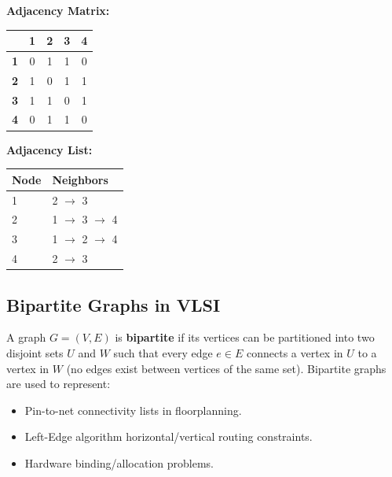 \documentclass[12pt,a4paper]{article}
\renewcommand{\arraystretch}{1.45}
\begin{document}
\begin{tcolorbox}[tikzbox, title={Graph Representation Example}]
\centering
\begin{minipage}{0.3\linewidth}
\centering
{}
\end{minipage}\hfill
\begin{minipage}{0.32\linewidth}
\centering
\textbf{Adjacency Matrix:}\par\noindent
{\renewcommand{\arraystretch}{1.2}%
\begin{tabular}{|c|c|c|c|c|}
\hline
& \textbf{1} & \textbf{2} & \textbf{3} & \textbf{4} \\
\hline
\textbf{1} & 0 & 1 & 1 & 0 \\
\hline
\textbf{2} & 1 & 0 & 1 & 1 \\
\hline
\textbf{3} & 1 & 1 & 0 & 1 \\
\hline
\textbf{4} & 0 & 1 & 1 & 0 \\
\hline
\end{tabular}}
\end{minipage}\hfill
\begin{minipage}{0.32\linewidth}
\centering
\textbf{Adjacency List:}\par\noindent
{\renewcommand{\arraystretch}{1.2}%
\begin{tabular}{|l|l|}
\hline
\textbf{Node} & \textbf{Neighbors} \\
\hline
1 & 2 $\rightarrow$ 3 \\
\hline
2 & 1 $\rightarrow$ 3 $\rightarrow$ 4 \\
\hline
3 & 1 $\rightarrow$ 2 $\rightarrow$ 4 \\
\hline
4 & 2 $\rightarrow$ 3 \\
\hline
\end{tabular}}
\end{minipage}
\end{tcolorbox}

\subsection{Bipartite Graphs in VLSI}
A graph $G = (V, E)$ is \textbf{bipartite} if its vertices can be partitioned into two disjoint sets $U$ and $W$ such that every edge $e \in E$ connects a vertex in $U$ to a vertex in $W$ (no edges exist between vertices of the same set). Bipartite graphs are used to represent:
\begin{itemize}[leftmargin=*, itemsep=2pt]
  \item Pin-to-net connectivity lists in floorplanning.
  \item Left-Edge algorithm horizontal/vertical routing constraints.
  \item Hardware binding/allocation problems.
\end{itemize}
\end{document}
